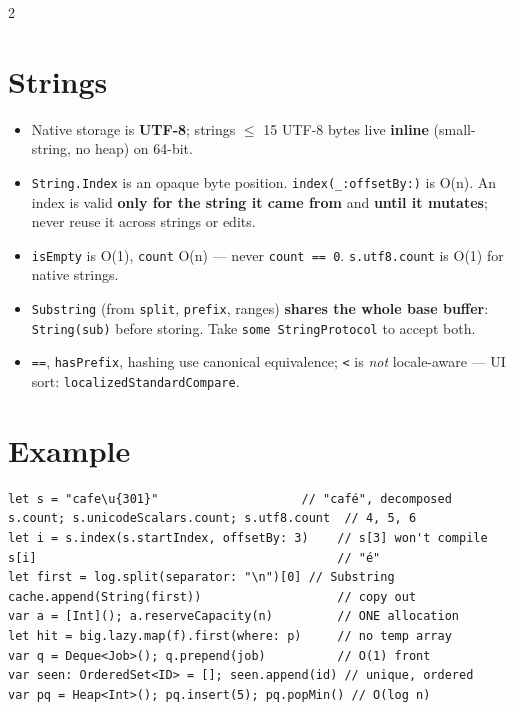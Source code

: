 \documentclass[8pt]{extarticle}
\begin{document}
\begin{multicols}{2}
\section{Strings}
\begin{itemize}
  \item Native storage is \textbf{UTF-8}; strings $\le$ 15 UTF-8 bytes live
        \textbf{inline} (small-string, no heap) on 64-bit.
  \item \texttt{String.Index} is an opaque byte position. \texttt{index(\_:offsetBy:)}
        is O(n). An index is valid \textbf{only for the string it came from}
        and \textbf{until it mutates}; never reuse it across strings or edits.
  \item \texttt{isEmpty} is O(1), \texttt{count} O(n) — never
        \texttt{count == 0}. \texttt{s.utf8.count} is O(1) for native strings.
  \item \texttt{Substring} (from \texttt{split}, \texttt{prefix}, ranges)
        \textbf{shares the whole base buffer}: \texttt{String(sub)} before storing.
        Take \texttt{some StringProtocol} to accept both.
  \item \texttt{==}, \texttt{hasPrefix}, hashing use canonical equivalence;
        \texttt{<} is \emph{not} locale-aware — UI sort:
        \texttt{localizedStandardCompare}.
\end{itemize}

\section{Example}
\begin{lstlisting}[language=SwiftSheet]
let s = "cafe\u{301}"                    // "café", decomposed
s.count; s.unicodeScalars.count; s.utf8.count  // 4, 5, 6
let i = s.index(s.startIndex, offsetBy: 3)    // s[3] won't compile
s[i]                                          // "é"
let first = log.split(separator: "\n")[0] // Substring
cache.append(String(first))                   // copy out
var a = [Int](); a.reserveCapacity(n)         // ONE allocation
let hit = big.lazy.map(f).first(where: p)     // no temp array
var q = Deque<Job>(); q.prepend(job)          // O(1) front
var seen: OrderedSet<ID> = []; seen.append(id) // unique, ordered
var pq = Heap<Int>(); pq.insert(5); pq.popMin() // O(log n)
\end{lstlisting}


\end{multicols}
\end{document}
